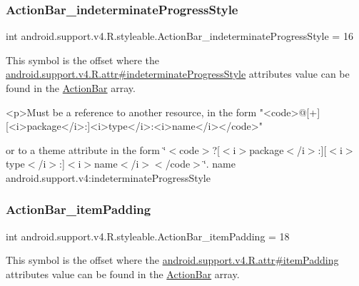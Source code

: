 \subsubsection{\texorpdfstring{Action\+Bar\+\_\+indeterminate\+Progress\+Style}{ActionBar\_indeterminateProgressStyle}}
{\footnotesize\ttfamily int android.\+support.\+v4.\+R.\+styleable.\+Action\+Bar\+\_\+indeterminate\+Progress\+Style = 16\hspace{0.3cm}{\ttfamily [static]}}

This symbol is the offset where the \hyperlink{classandroid_1_1support_1_1v4_1_1R_1_1attr_af1ca710e3b6f2eed102575a6bb2797ce}{android.\+support.\+v4.\+R.\+attr\#indeterminate\+Progress\+Style} attribute\textquotesingle{}s value can be found in the \hyperlink{classandroid_1_1support_1_1v4_1_1R_1_1styleable_adc5a3492b9c46265760d7120a04d6afa}{Action\+Bar} array.

\begin{DoxyVerb}      <p>Must be a reference to another resource, in the form "<code>@[+][<i>package</i>:]<i>type</i>:<i>name</i></code>"
\end{DoxyVerb}
 or to a theme attribute in the form \char`\"{}$<$code$>$?\mbox{[}$<$i$>$package$<$/i$>$\+:\mbox{]}\mbox{[}$<$i$>$type$<$/i$>$\+:\mbox{]}$<$i$>$name$<$/i$>$$<$/code$>$\char`\"{}.  name android.\+support.\+v4\+:indeterminate\+Progress\+Style \mbox{\label{classandroid_1_1support_1_1v4_1_1R_1_1styleable_a8548ce153987b04b5d4798301bc48594}} 
\subsubsection{\texorpdfstring{Action\+Bar\+\_\+item\+Padding}{ActionBar\_itemPadding}}
{\footnotesize\ttfamily int android.\+support.\+v4.\+R.\+styleable.\+Action\+Bar\+\_\+item\+Padding = 18\hspace{0.3cm}{\ttfamily [static]}}

This symbol is the offset where the \hyperlink{classandroid_1_1support_1_1v4_1_1R_1_1attr_a62722269620cd4510318f4893382708c}{android.\+support.\+v4.\+R.\+attr\#item\+Padding} attribute\textquotesingle{}s value can be found in the \hyperlink{classandroid_1_1support_1_1v4_1_1R_1_1styleable_adc5a3492b9c46265760d7120a04d6afa}{Action\+Bar} array.

